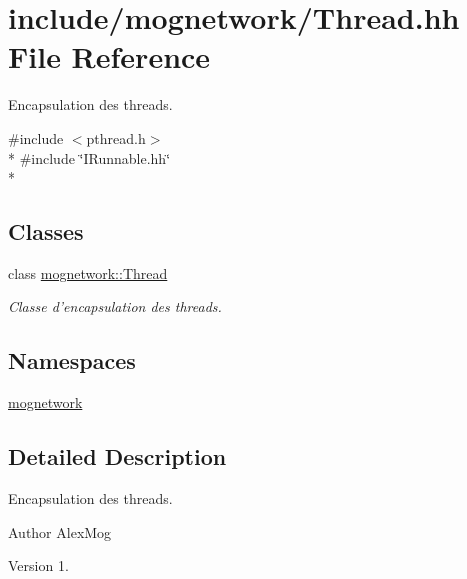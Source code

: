\hypertarget{_thread_8hh}{\section{include/mognetwork/\-Thread.hh File Reference}
\label{_thread_8hh}
}


Encapsulation des threads.  


{\ttfamily \#include $<$pthread.\-h$>$}\\*
{\ttfamily \#include \char`\"{}I\-Runnable.\-hh\char`\"{}}\\*
\subsection*{Classes}
\begin{DoxyCompactItemize}
\item 
class \hyperlink{classmognetwork_1_1_thread}{mognetwork\-::\-Thread}
\begin{DoxyCompactList}\small\item\em Classe d'encapsulation des threads. \end{DoxyCompactList}\end{DoxyCompactItemize}
\subsection*{Namespaces}
\begin{DoxyCompactItemize}
\item 
\hyperlink{namespacemognetwork}{mognetwork}
\end{DoxyCompactItemize}


\subsection{Detailed Description}
Encapsulation des threads. \begin{DoxyAuthor}{Author}
Alex\-Mog 
\end{DoxyAuthor}
\begin{DoxyVersion}{Version}
1. 
\end{DoxyVersion}
